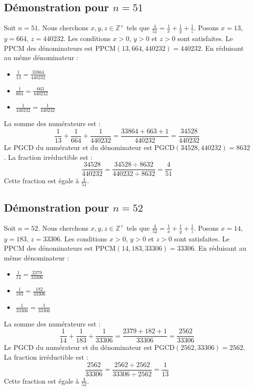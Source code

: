 \documentclass[11pt,a4paper]{article}
\begin{document}
\subsection{Démonstration pour $n = 51$}
Soit $n = 51$. Nous cherchons $x, y, z \in \mathbb{Z}^{+}$ tels que $\frac{4}{51} = \frac{1}{x} + \frac{1}{y} + \frac{1}{z}$.
Posons $x = 13$, $y = 664$, $z = 440232$.
Les conditions $x > 0$, $y > 0$ et $z > 0$ sont satisfaites.
Le PPCM des dénominateurs est $\text{PPCM}(13, 664, 440232) = 440232$.
En réduisant au même dénominateur :
\begin{itemize}
    \item $\frac{1}{13} = \frac{33864}{440232}$
    \item $\frac{1}{664} = \frac{663}{440232}$
    \item $\frac{1}{440232} = \frac{1}{440232}$
\end{itemize}
La somme des numérateurs est :
$$ \frac{1}{13} + \frac{1}{664} + \frac{1}{440232} = \frac{33864 + 663 + 1}{440232} = \frac{34528}{440232} $$
Le PGCD du numérateur et du dénominateur est $\text{PGCD}(34528, 440232) = 8632$.
La fraction irréductible est :
$$ \frac{34528}{440232} = \frac{34528 \div 8632}{440232 \div 8632} = \frac{4}{51} $$
Cette fraction est égale à $\frac{4}{51}$.

\subsection{Démonstration pour $n = 52$}
Soit $n = 52$. Nous cherchons $x, y, z \in \mathbb{Z}^{+}$ tels que $\frac{4}{52} = \frac{1}{x} + \frac{1}{y} + \frac{1}{z}$.
Posons $x = 14$, $y = 183$, $z = 33306$.
Les conditions $x > 0$, $y > 0$ et $z > 0$ sont satisfaites.
Le PPCM des dénominateurs est $\text{PPCM}(14, 183, 33306) = 33306$.
En réduisant au même dénominateur :
\begin{itemize}
    \item $\frac{1}{14} = \frac{2379}{33306}$
    \item $\frac{1}{183} = \frac{182}{33306}$
    \item $\frac{1}{33306} = \frac{1}{33306}$
\end{itemize}
La somme des numérateurs est :
$$ \frac{1}{14} + \frac{1}{183} + \frac{1}{33306} = \frac{2379 + 182 + 1}{33306} = \frac{2562}{33306} $$
Le PGCD du numérateur et du dénominateur est $\text{PGCD}(2562, 33306) = 2562$.
La fraction irréductible est :
$$ \frac{2562}{33306} = \frac{2562 \div 2562}{33306 \div 2562} = \frac{1}{13} $$
Cette fraction est égale à $\frac{4}{52}$.
\end{document}
